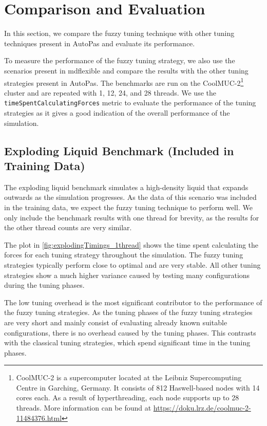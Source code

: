 \chapter{Comparison and Evaluation}
\label{sec:comparison_and_evaluation}

In this section, we compare the fuzzy tuning technique with other tuning techniques present in AutoPas and evaluate its performance.

To measure the performance of the fuzzy tuning strategy, we also use the scenarios present in \gls{mdflexible} and compare the results with the other tuning strategies present in AutoPas. The benchmarks are run on the CoolMUC-2\footnote{\label{CoolMucSpecs}CoolMUC-2 is a supercomputer located at the Leibniz Supercomputing Centre in Garching, Germany. It consists of 812 Haswell-based nodes with 14 cores each. As a result of hyperthreading, each node supports up to 28 threads. More information can be found at \url{https://doku.lrz.de/coolmuc-2-11484376.html}} cluster and are repeated with 1, 12, 24, and 28 threads. We use the \texttt{timeSpentCalculatingForces} metric to evaluate the performance of the tuning strategies as it gives a good indication of the overall performance of the simulation.


\section{Exploding Liquid Benchmark (Included in Training Data)}
\label{sec:explodingLiquidBenchmark}

The exploding liquid benchmark simulates a high-density liquid that expands outwards as the simulation progresses. As the data of this scenario was included in the training data, we expect the fuzzy tuning technique to perform well. We only include the benchmark results with one thread for brevity, as the results for the other thread counts are very similar.

The plot in \autoref{fig:explodingTimings_1thread} shows the time spent calculating the forces for each tuning strategy throughout the simulation. The fuzzy tuning strategies typically perform close to optimal and are very stable. All other tuning strategies show a much higher variance caused by testing many configurations during the tuning phases.

The low tuning overhead is the most significant contributor to the performance of the fuzzy tuning strategies. As the tuning phases of the fuzzy tuning strategies are very short and mainly consist of evaluating already known suitable configurations, there is no overhead caused by the tuning phases. This contrasts with the classical tuning strategies, which spend significant time in the tuning phases.

